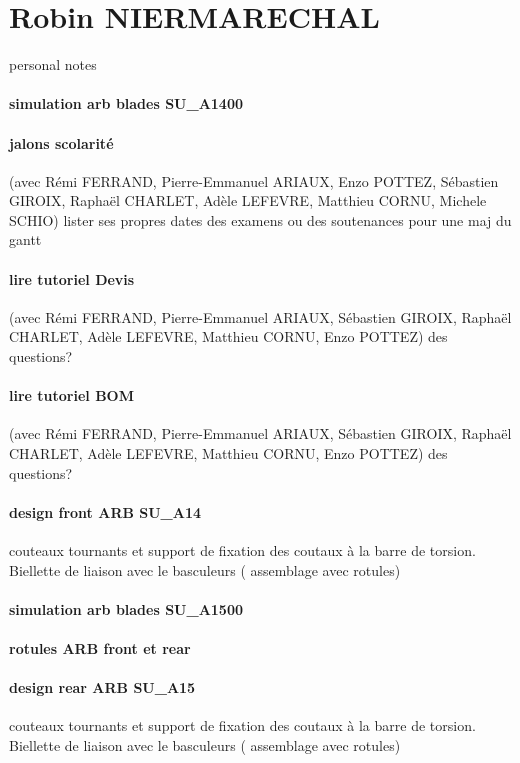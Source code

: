  
 \newpage \section*{Robin NIERMARECHAL} 
 \par personal notes
\paragraph{simulation arb blades SU\_A1400} 
\paragraph{jalons scolarité} (avec Rémi FERRAND, Pierre-Emmanuel ARIAUX, Enzo POTTEZ, Sébastien GIROIX, Raphaël CHARLET, Adèle LEFEVRE, Matthieu CORNU, Michele SCHIO) lister ses propres dates des examens ou des soutenances pour une maj du gantt
\paragraph{lire tutoriel Devis} (avec Rémi FERRAND, Pierre-Emmanuel ARIAUX, Sébastien GIROIX, Raphaël CHARLET, Adèle LEFEVRE, Matthieu CORNU, Enzo POTTEZ) des questions?
\paragraph{lire tutoriel BOM} (avec Rémi FERRAND, Pierre-Emmanuel ARIAUX, Sébastien GIROIX, Raphaël CHARLET, Adèle LEFEVRE, Matthieu CORNU, Enzo POTTEZ) des questions?
\paragraph{design front ARB SU\_A14} couteaux tournants et support de fixation des coutaux à la barre de torsion. Biellette de liaison avec le basculeurs ( assemblage avec rotules)
\paragraph{simulation arb blades SU\_A1500} 
\paragraph{rotules ARB front et rear} 
\paragraph{design rear ARB SU\_A15} couteaux tournants et support de fixation des coutaux à la barre de torsion. Biellette de liaison avec le basculeurs ( assemblage avec rotules)

